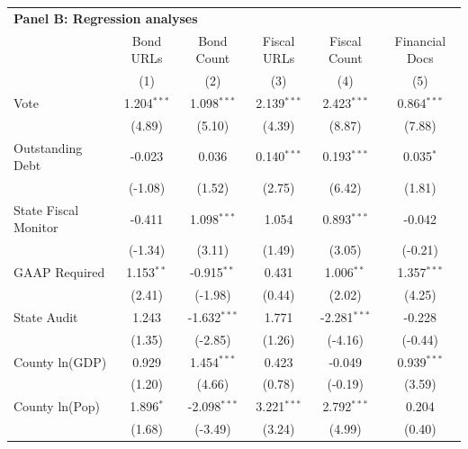 \begingroup
\centering
\begin{tabular*}{\textwidth}{@{\extracolsep{\fill}}lccccc}
\multicolumn{5}{l}{\textbf{Panel B: Regression analyses}}\\

\addlinespace
   \toprule
                        & Bond URLs     & Bond Count     & Fiscal URLs    & Fiscal Count   & Financial Docs\\  
                        & (1)           & (2)            & (3)            & (4)            & (5)\\  
   \midrule 
   Vote                 & 1.204$^{***}$ & 1.098$^{***}$  & 2.139$^{***}$  & 2.423$^{***}$  & 0.864$^{***}$\\   
                        & (4.89)       & (5.10)        & (4.39)        & (8.87)        & (7.88)\\   
   Outstanding Debt     & -0.023        & 0.036          & 0.140$^{***}$  & 0.193$^{***}$  & 0.035$^{*}$\\   
                        & (-1.08)      & (1.52)        & (2.75)        & (6.42)        & (1.81)\\   
   State Fiscal Monitor & -0.411        & 1.098$^{***}$  & 1.054          & 0.893$^{***}$  & -0.042\\   
                        & (-1.34)      & (3.11)        & (1.49)        & (3.05)        & (-0.21)\\   
   GAAP Required        & 1.153$^{**}$  & -0.915$^{**}$  & 0.431          & 1.006$^{**}$   & 1.357$^{***}$\\   
                        & (2.41)       & (-1.98)       & (0.44)        & (2.02)        & (4.25)\\   
   State Audit          & 1.243         & -1.632$^{***}$ & 1.771          & -2.281$^{***}$ & -0.228\\   
                        & (1.35)       & (-2.85)       & (1.26)        & (-4.16)       & (-0.44)\\   
   County ln(GDP)       & 0.929         & 1.454$^{***}$  & 0.423          & -0.049         & 0.939$^{***}$\\   
                        & (1.20)       & (4.66)        & (0.78)        & (-0.19)       & (3.59)\\   
   County ln(Pop)       & 1.896$^{*}$   & -2.098$^{***}$ & 3.221$^{***}$  & 2.792$^{***}$  & 0.204\\   
                        & (1.68)       & (-3.49)       & (3.24)        & (4.99)        & (0.40)\\   

\end{tabular*}

